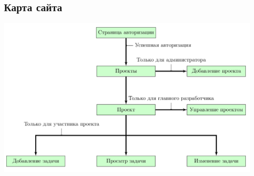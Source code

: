 \documentclass[14pt,a4paper]{extarticle}
\begin{document}
	\subsection {Карта сайта}
	\begin{center}
		\includegraphics[scale=0.4]{res/SiteMap/SiteMap.png} 
	\end{center}
			
\end{document}
